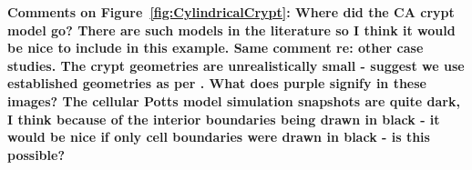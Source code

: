 \documentclass{article}
\newcommand{\highlight}[1]{{\color{red} \bf{#1}}}
\begin{document}
\highlight{Comments on Figure~\ref{fig:CylindricalCrypt}: 
Where did the CA crypt model go? There are such models in the literature so I think it would be nice to include in this example. 
Same comment re: other case studies. 
The crypt geometries are unrealistically small - suggest we use established geometries as per \citet{Mirams2012Theoretical}. 
What does purple signify in these images? 
The cellular Potts model simulation snapshots are quite dark, I think because of the interior boundaries being drawn in black - it would be nice if only cell boundaries were drawn in black - is this possible?
}

\begin{figure}
\centering
\setlength{\unitlength}{1cm}
\end{figure}
\end{document}
